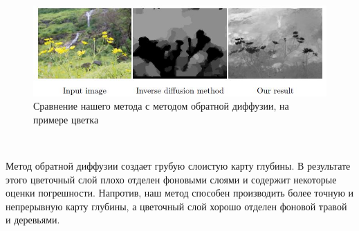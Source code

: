 \begin{figure}[H]
	\centering
	\includegraphics[width=1\linewidth]{pics/flower}
	\caption{Сравнение нашего метода с методом обратной диффузии, на примере цветка}
	\label{fig:flower}
\end{figure}\

Метод обратной диффузии создает грубую слоистую карту глубины. В результате этого цветочный слой плохо отделен фоновыми слоями и содержит некоторые оценки погрешности. Напротив, наш метод способен производить более точную и непрерывную карту глубины, а цветочный слой хорошо отделен фоновой травой и деревьями.